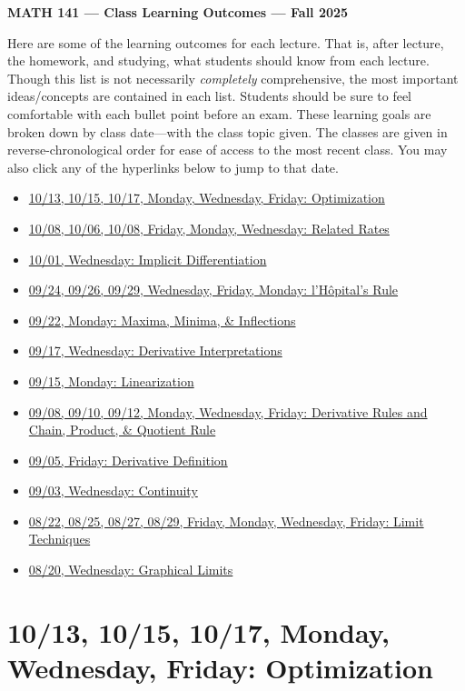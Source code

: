 \documentclass[11pt,letterpaper]{article}
\begin{document}
\begin{center} {\bfseries \LARGE MATH 141 --- Class Learning Outcomes --- Fall 2025} \end{center}

Here are some of the learning outcomes for each lecture. That is, after lecture, the homework, and studying, what students should know from each lecture. Though this list is not necessarily \textit{completely} comprehensive, the most important ideas/concepts are contained in each list. Students should be sure to feel comfortable with each bullet point before an exam. These learning goals are broken down by class date---with the class topic given. The classes are given in reverse-chronological order for ease of access to the most recent class. You may also click any of the hyperlinks below to jump to that date. 

\begin{itemize}
\item \hyperref[10-13]{10/13, 10/15, 10/17, Monday, Wednesday, Friday: Optimization}
\item \hyperref[10-03]{10/08, 10/06, 10/08, Friday, Monday, Wednesday: Related Rates}
\item \hyperref[10-01]{10/01, Wednesday: Implicit Differentiation}
\item \hyperref[09-24]{09/24, 09/26, 09/29, Wednesday, Friday, Monday: l'H\^{o}pital's Rule}
\item \hyperref[09-22]{09/22, Monday: Maxima, Minima, \& Inflections}
\item \hyperref[09-17]{09/17, Wednesday: Derivative Interpretations}
\item \hyperref[09-15]{09/15, Monday: Linearization}
\item \hyperref[09-08--09-12]{09/08, 09/10, 09/12, Monday, Wednesday, Friday: Derivative Rules and Chain, Product, \& Quotient Rule}
\item \hyperref[09-05]{09/05, Friday: Derivative Definition}
\item \hyperref[09-03]{09/03, Wednesday: Continuity}
\item \hyperref[08-22--08-29]{08/22, 08/25, 08/27, 08/29, Friday, Monday, Wednesday, Friday: Limit Techniques}
\item \hyperref[08-20]{08/20, Wednesday: Graphical Limits}
\end{itemize}

\newpage
\section*{10/13, 10/15, 10/17, Monday, Wednesday, Friday: Optimization\label{10-13}}
\end{document}
